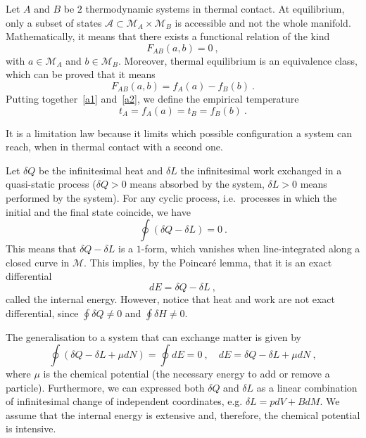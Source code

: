     \begin{law}[0th]
        Let $A$ and $B$ be $2$ thermodynamic systems in thermal contact. At equilibrium, only a subset of states $\mathcal A \subset \mathcal M_A \times \mathcal M_B$ is accessible and not the whole manifold. Mathematically, it means that there exists a functional relation of the kind
        \begin{equation}\label{a1}
            F_{AB} (a,b)= 0 ~,
        \end{equation}
        with $a \in \mathcal M_A$ and $b \in \mathcal M_B$. Moreover, thermal equilibrium is an equivalence class, which can be proved that it means 
        \begin{equation}\label{a2}
            F_{AB} (a,b) = f_A(a) - f_B(b) ~.
        \end{equation}
        Putting together~\eqref{a1} and~\eqref{a2}, we define the empirical temperature 
        \begin{equation*}
            t_A = f_A(a) = t_B = f_B(b) ~.
        \end{equation*}
    \end{law}

    It is a limitation law because it limits which possible configuration a system can reach, when in thermal contact with a second one. 

    \begin{law}[1st]
        Let $\delta Q$ be the infinitesimal heat and $\delta L$ the infinitesimal work exchanged in a quasi-static process ($\delta Q > 0$ means absorbed by the system, $\delta L > 0$ means performed by the system). For any cyclic process, i.e.~processes in which the initial and the final state coincide, we have
        \begin{equation*}
            \oint (\delta Q - \delta L) = 0 ~.
        \end{equation*}
        This means that $\delta Q - \delta L$ is a $1$-form, which vanishes when line-integrated along a closed curve in $\mathcal M$. This implies, by the Poincaré lemma, that it is an exact differential 
        \begin{equation*}
            dE = \delta Q - \delta L ~,
        \end{equation*}
        called the internal energy. However, notice that heat and work are not exact differential, since $\oint \delta Q \neq 0$ and $\oint \delta H \neq 0$. 
        
        The generalisation to a system that can exchange matter is given by
        \begin{equation}\label{td:1st}
            \oint (\delta Q - \delta L + \mu dN) = \oint dE = 0 ~, \quad dE = \delta Q - \delta L + \mu dN ~,
        \end{equation} 
        where $\mu$ is the chemical potential (the necessary energy to add or remove a particle). Furthermore, we can expressed both $\delta Q$ and $\delta L$ as a linear combination of infinitesimal change of independent coordinates, e.g. $\delta L = p dV + B dM$. We assume that the internal energy is extensive and, therefore, the chemical potential is intensive.
    \end{law}

